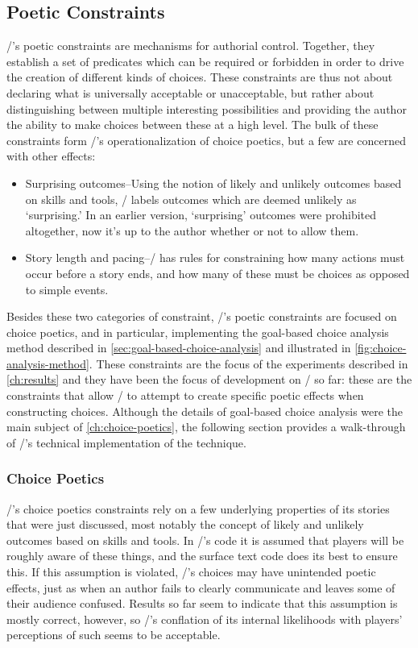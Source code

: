 \subsection{Poetic Constraints}
\label{sec:dunyazad-poetic-constraints}

\dunyazad/'s poetic constraints are mechanisms for authorial control.
%
Together, they establish a set of predicates which can be required or forbidden in order to drive the creation of different kinds of choices.
%
These constraints are thus not about declaring what is universally acceptable or unacceptable, but rather about distinguishing between multiple interesting possibilities and providing the author the ability to make choices between these at a high level.
%
The bulk of these constraints form \dunyazad/'s operationalization of choice poetics, but a few are concerned with other effects:
%
\begin{itemize}
  \item Surprising outcomes--Using the notion of likely and unlikely outcomes based on skills and tools, \dunyazad/ labels outcomes which are deemed unlikely as `surprising.' In an earlier version, `surprising' outcomes were prohibited altogether, now it's up to the author whether or not to allow them.
  \item Story length and pacing--\dunyazad/ has rules for constraining how many actions must occur before a story ends, and how many of these must be choices as opposed to simple events.
\end{itemize}
%
Besides these two categories of constraint, \dunyazad/'s poetic constraints are focused on choice poetics, and in particular, implementing the goal-based choice analysis method described in \cref{sec:goal-based-choice-analysis} and illustrated in \cref{fig:choice-analysis-method}.
%
These constraints are the focus of the experiments described in \cref{ch:results} and they have been the focus of development on \dunyazad/ so far: these are the constraints that allow \dunyazad/ to attempt to create specific poetic effects when constructing choices.
%
Although the details of goal-based choice analysis were the main subject of \cref{ch:choice-poetics}, the following section provides a walk-through of \dunyazad/'s technical implementation of the technique.

\subsubsection{Choice Poetics}

\dunyazad/'s choice poetics constraints rely on a few underlying properties of its stories that were just discussed, most notably the concept of likely and unlikely outcomes based on skills and tools.
%
In \dunyazad/'s code it is assumed that players will be roughly aware of these things, and the surface text code does its best to ensure this.
%
If this assumption is violated, \dunyazad/'s choices may have unintended poetic effects, just as when an author fails to clearly communicate and leaves some of their audience confused.
%
Results so far seem to indicate that this assumption is mostly correct, however, so \dunyazad/'s conflation of its internal likelihoods with players' perceptions of such seems to be acceptable.


